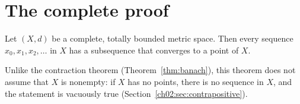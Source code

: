 \section{The complete proof}\label{ch17:sec:proof}
\par\noindent\begin{minipage}{\linewidth}
\begin{theorem}\label{thm:subsequence}
Let $(X,d)$ be a complete, totally bounded metric space. Then every sequence $x_0,x_1,x_2,\ldots$ in $X$ has a subsequence that converges to a point of $X$.
\end{theorem}
\end{minipage}\par

Unlike the contraction theorem (Theorem~\ref{thm:banach}), this theorem does not assume that $X$ is nonempty: if $X$ has no points, there is no sequence in $X$, and the statement is vacuously true (Section~\ref{ch02:sec:contrapositive}).

